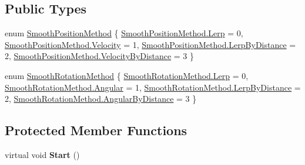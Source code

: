 \subsection*{Public Types}
\begin{DoxyCompactItemize}
\item 
enum \mbox{\hyperlink{class_ximmerse_1_1_slide_in_s_d_k_1_1_marker_target_behaviour_a7dcc532413ef0b35cf9f17dc0ae276bb}{Smooth\+Position\+Method}} \{ \mbox{\hyperlink{class_ximmerse_1_1_slide_in_s_d_k_1_1_marker_target_behaviour_a7dcc532413ef0b35cf9f17dc0ae276bba412cb411cecf9196f717d6bc9c272c62}{Smooth\+Position\+Method.\+Lerp}} = 0, 
\mbox{\hyperlink{class_ximmerse_1_1_slide_in_s_d_k_1_1_marker_target_behaviour_a7dcc532413ef0b35cf9f17dc0ae276bba88156d46910a2d733443c339a9231d12}{Smooth\+Position\+Method.\+Velocity}} = 1, 
\mbox{\hyperlink{class_ximmerse_1_1_slide_in_s_d_k_1_1_marker_target_behaviour_a7dcc532413ef0b35cf9f17dc0ae276bba2ae4d28d251b2ea2897f7fa9343c51ee}{Smooth\+Position\+Method.\+Lerp\+By\+Distance}} = 2, 
\mbox{\hyperlink{class_ximmerse_1_1_slide_in_s_d_k_1_1_marker_target_behaviour_a7dcc532413ef0b35cf9f17dc0ae276bba54d76827231a55b3a08cfb1eab9f0fbe}{Smooth\+Position\+Method.\+Velocity\+By\+Distance}} = 3
 \}
\item 
enum \mbox{\hyperlink{class_ximmerse_1_1_slide_in_s_d_k_1_1_marker_target_behaviour_a1b1d93ad85038ec1f7f0b36dbe2b2e2d}{Smooth\+Rotation\+Method}} \{ \mbox{\hyperlink{class_ximmerse_1_1_slide_in_s_d_k_1_1_marker_target_behaviour_a1b1d93ad85038ec1f7f0b36dbe2b2e2da412cb411cecf9196f717d6bc9c272c62}{Smooth\+Rotation\+Method.\+Lerp}} = 0, 
\mbox{\hyperlink{class_ximmerse_1_1_slide_in_s_d_k_1_1_marker_target_behaviour_a1b1d93ad85038ec1f7f0b36dbe2b2e2dac31c335ef37283c451b18ba0dd317de1}{Smooth\+Rotation\+Method.\+Angular}} = 1, 
\mbox{\hyperlink{class_ximmerse_1_1_slide_in_s_d_k_1_1_marker_target_behaviour_a1b1d93ad85038ec1f7f0b36dbe2b2e2da2ae4d28d251b2ea2897f7fa9343c51ee}{Smooth\+Rotation\+Method.\+Lerp\+By\+Distance}} = 2, 
\mbox{\hyperlink{class_ximmerse_1_1_slide_in_s_d_k_1_1_marker_target_behaviour_a1b1d93ad85038ec1f7f0b36dbe2b2e2da585bb6f17552226d32175628abbd7e34}{Smooth\+Rotation\+Method.\+Angular\+By\+Distance}} = 3
 \}
\end{DoxyCompactItemize}
\subsection*{Protected Member Functions}
\begin{DoxyCompactItemize}
\item 
\mbox{\label{class_ximmerse_1_1_slide_in_s_d_k_1_1_marker_target_behaviour_a6e4f7e4e950e7c8cc96a4dcad51549e6}} 
virtual void {\bfseries Start} ()
\end{DoxyCompactItemize}
